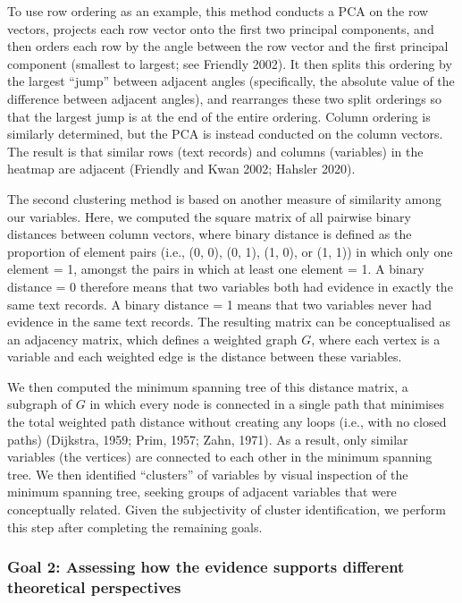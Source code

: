 \documentclass[
  11pt,
]{article}
\begin{document}
To use row ordering as an example, this method conducts a PCA on the row vectors, projects each row vector onto the first two principal components, and then orders each row by the angle between the row vector and the first principal component (smallest to largest; see Friendly 2002). It then splits this ordering by the largest ``jump'' between adjacent angles (specifically, the absolute value of the difference between adjacent angles), and rearranges these two split orderings so that the largest jump is at the end of the entire ordering. Column ordering is similarly determined, but the PCA is instead conducted on the column vectors. The result is that similar rows (text records) and columns (variables) in the heatmap are adjacent (Friendly and Kwan 2002; Hahsler 2020).

The second clustering method is based on another measure of similarity among our variables. Here, we computed the square matrix of all pairwise binary distances between column vectors, where binary distance is defined as the proportion of element pairs (i.e., (0, 0), (0, 1), (1, 0), or (1, 1)) in which only one element = 1, amongst the pairs in which at least one element = 1. A binary distance = 0 therefore means that two variables both had evidence in exactly the same text records. A binary distance = 1 means that two variables never had evidence in the same text records. The resulting matrix can be conceptualised as an adjacency matrix, which defines a weighted graph \(G\), where each vertex is a variable and each weighted edge is the distance between these variables.

We then computed the minimum spanning tree of this distance matrix, a subgraph of \(G\) in which every node is connected in a single path that minimises the total weighted path distance without creating any loops (i.e., with no closed paths) (Dijkstra, 1959; Prim, 1957; Zahn, 1971). As a result, only similar variables (the vertices) are connected to each other in the minimum spanning tree. We then identified ``clusters'' of variables by visual inspection of the minimum spanning tree, seeking groups of adjacent variables that were conceptually related. Given the subjectivity of cluster identification, we perform this step after completing the remaining goals.

\hypertarget{goal-2-assessing-how-the-evidence-supports-different-theoretical-perspectives}{%
\subsubsection{Goal 2: Assessing how the evidence supports different theoretical perspectives}\label{goal-2-assessing-how-the-evidence-supports-different-theoretical-perspectives}}
\end{document}
